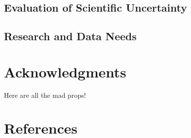 \documentclass[11pt,
  english,
  letterpaper,
]{article}
\begin{document}
\hypertarget{evaluation-of-scientific-uncertainty}{%
\subsection{Evaluation of Scientific Uncertainty}\label{evaluation-of-scientific-uncertainty}}

\hypertarget{research-and-data-needs-1}{%
\subsection{Research and Data Needs}\label{research-and-data-needs-1}}

\hypertarget{acknowledgments}{%
\section{Acknowledgments}\label{acknowledgments}}

Here are all the mad props!

\clearpage

\hypertarget{references}{%
\section{References}\label{references}}
\end{document}

